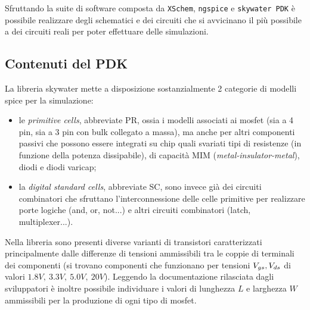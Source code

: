 	
	Sfruttando la suite di software composta da \texttt{XSchem}, \texttt{ngspice} e \texttt{skywater PDK} è possibile realizzare degli schematici e dei circuiti che si avvicinano il più possibile a dei circuiti reali per poter effettuare delle simulazioni.
	
	\subsection*{Contenuti del PDK}
		La libreria skywater mette a disposizione sostanzialmente 2 categorie di modelli spice per la simulazione:
		\begin{itemize}
			\item le \textit{primitive cells}, abbreviate PR, ossia i modelli associati ai mosfet (sia a 4 pin, sia a 3 pin con bulk collegato a massa), ma anche per altri componenti passivi che possono essere integrati su chip quali svariati tipi di resistenze (in funzione della potenza dissipabile), di capacità MIM (\textit{metal-insulator-metal}), diodi e diodi varicap;
			
			\item la \textit{digital standard cells}, abbreviate SC, sono invece già dei circuiti combinatori che sfruttano l'interconnessione delle celle primitive per realizzare porte logiche (and, or, not...) e altri circuiti combinatori (latch, multiplexer...).
		\end{itemize}
		
		Nella libreria sono presenti diverse varianti di transistori caratterizzati principalmente dalle differenze di tensioni ammissibili tra le coppie di terminali dei componenti (si trovano componenti che funzionano per tensioni $V_{gs},V_{ds}$ di valori $1.8V,\ 3.3V,\ 5.0V, \ 20V$).  Leggendo la documentazione \cite{specsky} rilasciata dagli sviluppatori è inoltre possibile individuare i valori di lunghezza $L$ e larghezza $W$ ammissibili per la produzione di ogni tipo di mosfet.	
		
